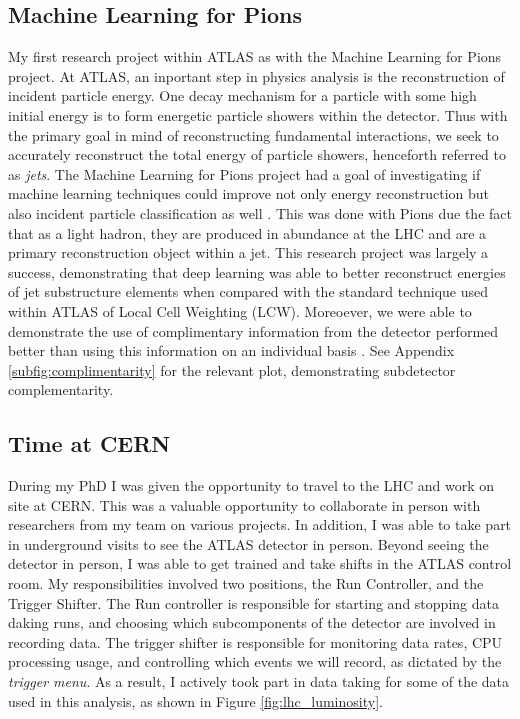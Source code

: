 \documentclass[12pt]{article}
\begin{document}
\subsection{Machine Learning for Pions}
My first research project within ATLAS as with the Machine Learning for Pions
project. At ATLAS, an inportant step in physics analysis is the reconstruction
of incident particle energy. One decay mechanism for a particle with some high
initial energy is to form energetic particle showers within the detector. Thus
with the primary goal in mind of reconstructing fundamental interactions, we
seek to accurately reconstruct the total energy of particle showers, henceforth
referred to as \textit{jets}. The Machine Learning for Pions project had a goal
of investigating if machine learning techniques could improve not only energy
reconstruction but also incident particle classification as well
\cite{ml4p_prelim}. This was done with Pions due the fact that as a light
hadron, they are produced in abundance at the LHC and are a primary
reconstruction object within a jet. This research project was largely a success,
demonstrating that deep learning was able to better reconstruct energies of jet
substructure elements when compared with the standard technique used within
ATLAS of Local Cell Weighting (LCW). Moreoever, we were able to demonstrate the
use of complimentary information from the detector performed better than using
this information on an individual basis \cite{ml4p}. See Appendix
\ref{subfig:complimentarity} for the relevant plot, demonstrating subdetector
complementarity.

\subsection{Time at CERN}
During my PhD I was given the opportunity to travel to the LHC and work on site
at CERN. This was a valuable opportunity to collaborate in person with
researchers from my team on various projects. In addition, I was able to take
part in underground visits to see the ATLAS detector in person. Beyond seeing
the detector in person, I was able to get trained and take shifts in the ATLAS
control room. My responsibilities involved two positions, the Run Controller,
and the Trigger Shifter. The Run controller is responsible for starting and
stopping data daking runs, and choosing which subcomponents of the detector are
involved in recording data. The trigger shifter is responsible for monitoring
data rates, CPU processing usage, and controlling which events we will record,
as dictated by the \textit{trigger menu}. As a result, I actively took part in
data taking for some of the data used in this analysis, as shown in Figure
\ref{fig:lhc_luminosity}.
\end{document}
